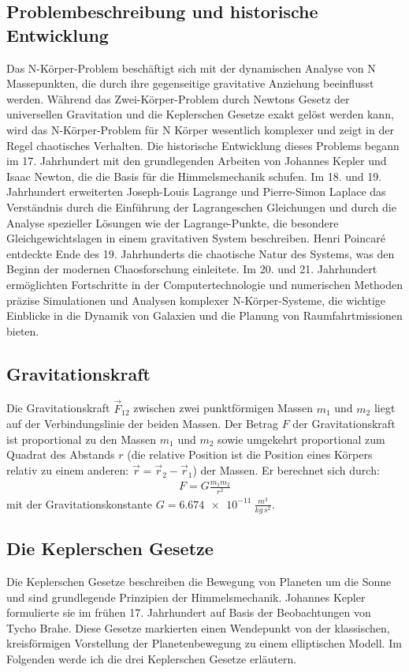 \documentclass[a4paper,12pt,twoside]{article}
\begin{document}
\subsection{Problembeschreibung und historische Entwicklung}
Das N-Körper-Problem beschäftigt sich mit der dynamischen Analyse von N Massepunkten, die durch ihre gegenseitige gravitative Anziehung beeinflusst werden. Während das Zwei-Körper-Problem durch Newtons Gesetz der universellen Gravitation und die Keplerschen Gesetze exakt gelöst werden kann, wird das N-Körper-Problem für N Körper wesentlich komplexer und zeigt in der Regel chaotisches Verhalten. Die historische Entwicklung dieses Problems begann im 17. Jahrhundert mit den grundlegenden Arbeiten von Johannes Kepler und Isaac Newton, die die Basis für die Himmelsmechanik schufen. Im 18. und 19. Jahrhundert erweiterten Joseph-Louis Lagrange und Pierre-Simon Laplace das Verständnis durch die Einführung der Lagrangeschen Gleichungen und durch die Analyse spezieller Lösungen wie der Lagrange-Punkte, die besondere Gleichgewichtslagen in einem gravitativen System beschreiben. Henri Poincaré entdeckte Ende des 19. Jahrhunderts die chaotische Natur des Systems, was den Beginn der modernen Chaosforschung einleitete. Im 20. und 21. Jahrhundert ermöglichten Fortschritte in der Computertechnologie und numerischen Methoden präzise Simulationen und Analysen komplexer N-Körper-Systeme, die wichtige Einblicke in die Dynamik von Galaxien und die Planung von Raumfahrtmissionen bieten.

\subsection{Gravitationskraft}
Die Gravitationskraft $\vec{F}_{12}$ zwischen zwei punktförmigen Massen $m_1$ und $m_2$ liegt auf der Verbindungslinie der beiden Massen. Der Betrag $F$ der Gravitationskraft ist proportional zu den Massen $m_1$ und $m_2$ sowie umgekehrt proportional zum Quadrat des Abstands $r$ (die relative Position ist die Position eines Körpers relativ zu einem anderen: \(\vec{r} = \vec{r}_2 - \vec{r}_1\)) der Massen. Er berechnet sich durch:
\begin{align*}
	F = G \frac{m_1 m_2}{r^2}
\end{align*}
mit der Gravitationskonstante $G = \SI{6.674e-11}{\frac{m^3}{kg\,s^2}}$.

\subsection{Die Keplerschen Gesetze}
Die Keplerschen Gesetze beschreiben die Bewegung von Planeten um die Sonne und sind grundlegende Prinzipien der Himmelsmechanik. Johannes Kepler formulierte sie im frühen 17. Jahrhundert auf Basis der Beobachtungen von Tycho Brahe. Diese Gesetze markierten einen Wendepunkt von der klassischen, kreisförmigen Vorstellung der Planetenbewegung zu einem elliptischen Modell. Im Folgenden werde ich die drei Keplerschen Gesetze erläutern.
\end{document}
